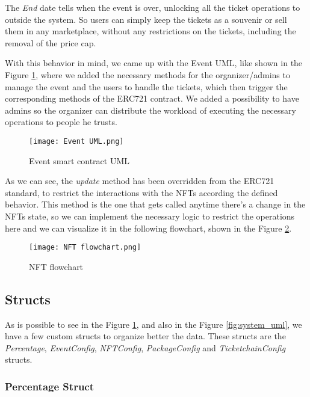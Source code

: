 The \textit{End} date tells when the event is over, unlocking all the ticket operations to outside the system. So users can simply keep the tickets as a souvenir or sell them in any marketplace, without any restrictions on the tickets, including the removal of the price cap.

With this behavior in mind, we came up with the Event UML, like shown in the Figure \ref{fig:event_uml}, where we added the necessary methods for the organizer/admins to manage the event and the users to handle the tickets, which then trigger the corresponding methods of the ERC721 contract. We added a possibility to have admins so the organizer can distribute the workload of executing the necessary operations to people he trusts.

\begin{figure}[H]
    \texttt{[image: Event UML.png]}
    \centering
    \caption{Event smart contract UML}
    \label{fig:event_uml}
\end{figure}

As we can see, the \textit{update} method has been overridden from the ERC721 standard, to restrict the interactions with the NFTs according the defined behavior. This method is the one that gets called anytime there's a change in the NFTs state, so we can implement the necessary logic to restrict the operations here and we can visualize it in the following flowchart, shown in the Figure \ref{fig:nft_flowchart}.

\begin{figure}[H]
    \texttt{[image: NFT flowchart.png]}
    \centering
    \caption{NFT flowchart}
    \label{fig:nft_flowchart}
\end{figure}

\subsection{Structs}
\label{subsec:structs}

As is possible to see in the Figure \ref{fig:event_uml}, and also in the Figure \ref{fig:system_uml}, we have a few custom structs to organize better the data. These structs are the \textit{Percentage}, \textit{EventConfig}, \textit{NFTConfig}, \textit{PackageConfig} and \textit{TicketchainConfig} structs.

\subsubsection{Percentage Struct}

